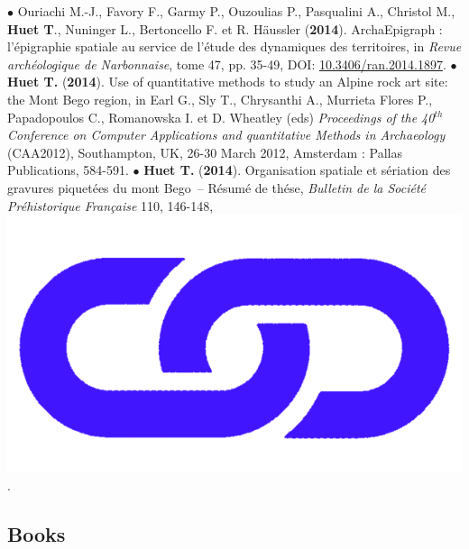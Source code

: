 \documentclass{article}
\newcommand{\fr}[1]{} %
\newcommand{\en}[1]{#1}   %
\begin{document}
{\smallbreak
$\bullet$ Ouriachi M.-J., Favory F., Garmy P., Ouzoulias P., Pasqualini A., Christol M., \textbf{Huet T}., Nuninger L., Bertoncello F. et R. H\"{a}ussler (\textbf{2014}). ArchaEpigraph : l'\'{e}pigraphie spatiale au service de l'\'{e}tude des dynamiques des territoires, in \textit{Revue arch\'{e}ologique de Narbonnaise}, tome 47, pp. 35-49, DOI: \href{https://doi.org/10.3406/ran.2014.1897}{10.3406/ran.2014.1897}.
\smallbreak
$\bullet$ \textbf{Huet T.} (\textbf{2014}). Use of quantitative methods to study an Alpine rock art site: the Mont Bego region, in Earl G., Sly T., Chrysanthi A., Murrieta Flores P., Papadopoulos C., Romanowska I. et D. Wheatley (eds) \textit{Proceedings of the 40${}^{th}$ Conference on Computer Applications and quantitative Methods in Archaeology} (CAA2012), Southampton, UK, 26-30 March 2012, Amsterdam : Pallas Publications, 584-591.
\smallbreak
$\bullet$ \textbf{Huet T.} (\textbf{2014}). Organisation spatiale et s\'{e}riation des gravures piquet\'{e}es du mont Bego~-- R\'{e}sum\'{e} de th\'{e}se, \textit{Bulletin de la Soci\'{e}t\'{e} Pr\'{e}historique Fran\c{c}aise} 110, 146-148, \href{https://www.persee.fr/doc/bspf_0249-7638_2013_num_110_1_14242}{\includegraphics[scale=0.02]{link_darkblue.png}}.

\subsection*{\fr{Ouvrages}\en{Books}}

}
\end{document}
